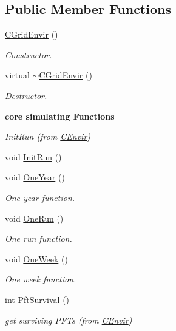 \subsection*{Public Member Functions}
\begin{DoxyCompactItemize}
\item 
\mbox{\hyperlink{class_c_grid_envir_ab3cf850b9fa815748dd555bd1704441d}{C\+Grid\+Envir}} ()
\begin{DoxyCompactList}\small\item\em Constructor. \end{DoxyCompactList}\item 
virtual \mbox{\hyperlink{class_c_grid_envir_a825ef1eb30d856e0ecee1f429a202314}{$\sim$\+C\+Grid\+Envir}} ()
\begin{DoxyCompactList}\small\item\em Destructor. \end{DoxyCompactList}\end{DoxyCompactItemize}
\begin{Indent}\textbf{ core simulating Functions}\par
{\em Init\+Run (from \mbox{\hyperlink{class_c_envir}{C\+Envir}}) }\begin{DoxyCompactItemize}
\item 
void \mbox{\hyperlink{class_c_grid_envir_a5db9b9b5fb26f6f6cbc3b3904ace0b68}{Init\+Run}} ()
\item 
\mbox{\label{class_c_grid_envir_ae7d159245558c84daa3eadd057c31c4e}} 
void \mbox{\hyperlink{class_c_grid_envir_ae7d159245558c84daa3eadd057c31c4e}{One\+Year}} ()
\begin{DoxyCompactList}\small\item\em One year function. \end{DoxyCompactList}\item 
void \mbox{\hyperlink{class_c_grid_envir_ab44b39db400c6fae4cfa623546f7fe4a}{One\+Run}} ()
\begin{DoxyCompactList}\small\item\em One run function. \end{DoxyCompactList}\item 
void \mbox{\hyperlink{class_c_grid_envir_a5c5cde58adbcee3ec3fd54c734228bf6}{One\+Week}} ()
\begin{DoxyCompactList}\small\item\em One week function. \end{DoxyCompactList}\item 
int \mbox{\hyperlink{class_c_grid_envir_aed2b467efa481b601ef4147cc990debc}{Pft\+Survival}} ()
\begin{DoxyCompactList}\small\item\em get surviving P\+F\+Ts (from \mbox{\hyperlink{class_c_envir}{C\+Envir}}) \end{DoxyCompactList}\end{DoxyCompactItemize}
\end{Indent}
